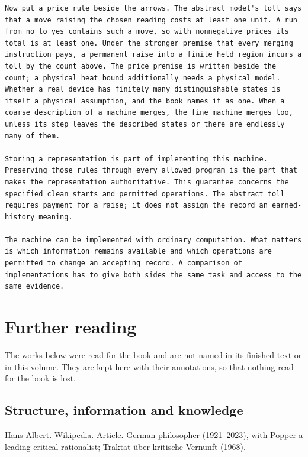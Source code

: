 \documentclass[11pt,twoside]{article}
\theoremstyle{thielethm}
\theoremstyle{thieledef}
\theoremstyle{thieledef}
\theoremstyle{thieledef}
\theoremstyle{thielethm}
\theoremstyle{thieleobs}
\theoremstyle{thielethm}
\begin{document}
\begin{small}
\begin{verbatim}
Now put a price rule beside the arrows. The abstract model's toll says that a move raising the chosen reading costs at least one unit. A run from no to yes contains such a move, so with nonnegative prices its total is at least one. Under the stronger premise that every merging instruction pays, a permanent raise into a finite held region incurs a toll by the count above. The price premise is written beside the count; a physical heat bound additionally needs a physical model. Whether a real device has finitely many distinguishable states is itself a physical assumption, and the book names it as one. When a coarse description of a machine merges, the fine machine merges too, unless its step leaves the described states or there are endlessly many of them.

Storing a representation is part of implementing this machine. Preserving those rules through every allowed program is the part that makes the representation authoritative. This guarantee concerns the specified clean starts and permitted operations. The abstract toll requires payment for a raise; it does not assign the record an earned-history meaning.

The machine can be implemented with ordinary computation. What matters is which information remains available and which operations are permitted to change an accepting record. A comparison of implementations has to give both sides the same task and access to the same evidence.

\end{verbatim}\end{small}

\section{Further reading}

The works below were read for the book and are not named in its finished text or in this volume. They are kept here with their annotations, so that nothing read for the book is lost.

\subsection{Structure, information and knowledge}



\noindent Hans Albert. Wikipedia. \href{https://en.wikipedia.org/wiki/Hans_Albert}{Article}. German philosopher (1921--2023), with Popper a leading critical rationalist; Traktat über kritische Vernunft (1968).
\par\medskip
\end{document}

